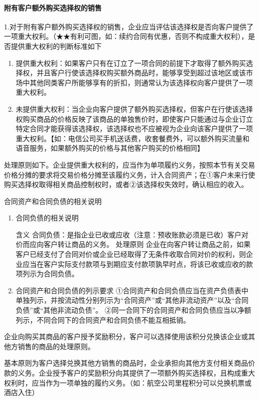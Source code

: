 \documentclass[UTF8,12pt]{ctexart}
\numberwithin{equation}{section} %
\numberwithin{figure}{section}
\numberwithin{table}{section}
\begin{document}
	
	\paragraph{附有客户额外购买选择权的销售}
	1.对于附有客户额外购买选择权的销售，企业应当评估该选择权是否向客户提供了一项重大权利。（★★有利可图，如：续约合同有优惠，否则不构成重大权利），是否提供重大权利的判断标准如下
	\begin{enumerate}
		\item 提供重大权利：如果客户只有在订立了一项合同的前提下才取得了额外购买选择权，并且客户行使该选择权购买额外商品时，能够享受到超过该地区或该市场中其他同类客户所能够享有的折扣，则通常认为该选择权向客户提供了一项重大权利。
		
		\item 未提供重大权利：当企业向客户提供了额外购买选择权，但客户在行使该选择权购买商品的价格反映了该商品的单独售价时，即使客户只能通过与企业订立特定合同才能获得该选择权，该选择权也不应被视为企业向该客户提供了一项重大权利。【如：电信公司买手机送话费，收套餐费外，可以额外购买流量和语音服务，如果额外购买的价格与其他客户购买的价格相同】
	\end{enumerate}
	
	处理原则如下。企业提供重大权利的，应当作为单项履约义务，按照本节有关交易价格分摊的要求将交易价格分摊至该履约义务，计入合同资产；在①客户未来行使购买选择权取得相关商品控制权时，或者②该选择权失效时，确认相应的收入。
	
	合同资产和合同负债的相关说明
	\begin{enumerate}
		\item 合同负债的相关说明
		
		含义	合同负债：是指企业已收或应收（注意：预收账款必须是已收）客户对价而应向客户转让商品的义务。
		处理原则	企业在向客户转让商品之前，如果客户已经支付了合同对价或企业已经取得了无条件收取合同对价的权利，则企业应当在客户实际支付款项与到期应支付款项孰早时点，将该已收或应收的款项列示为合同负债。
		
		\item 合同资产和合同负债的列示要求
		①合同资产和合同负债应当在资产负债表中单独列示，并按流动性分别列示为“合同资产”或“其他非流动资产”以及“合同负债”或“其他非流动负债”。
		②同一合同下的合同资产和合同负债应当以净额列示，不同合同下的合同资产和合同负债不能互相抵销。
	\end{enumerate}
	
	
	企业向购买其商品的客户授予奖励积分，客户可以选择使用该积分兑换该企业或其他方销售的商品的处理原则。
	
	基本原则为客户选择兑换其他方销售的商品时，企业承担向其他方支付相关商品价款的义务。企业授予客户的奖励积分向其提供了一项额外购买选择权，且构成重大权利时，应当作为一项单独的履约义务。（如：航空公司里程积分可以兑换机票或酒店入住）
	
\end{document}
